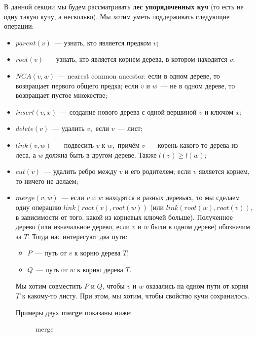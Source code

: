 В данной секции мы будем рассматривать \textbf{лес упорядоченных куч} (то есть не одну такую кучу, а несколько). Мы хотим уметь поддерживать следующие операции:
\begin{itemize}
        \item $parent(v)$~--- узнать, кто является предком $v$;
        \item $root(v)$~--- узнать, кто является корнем дерева, в котором находится $v$;
        \item  $NCA(v, w)$~--- nearest common ancestor: если в одном дереве, то возвращает первого общего предка; если $v$ и $w$~--- не в одном дереве, то возвращает пустое множестве;
        \item $insert(v, x)$~--- создание нового дерева с одной вершиной $v$ и ключом $x;$
        \item $delete(v)$~--- удалить $v,$ если $v$~--- лист;
        \item $link(v, w)$~--- подвесить $v$ к $w,$ причём $v$~--- корень какого-то дерева из леса, а $w$ должна быть в другом дереве. Также $l(v)\geqslant l(w);$
        \item $cut(v)$~--- удалить ребро между $v$ и его родителем; если $v$ является корнем, то ничего не делаем;
       \item $merge(v, w)$~--- если $v$ и $w$ находятся в разных деревьях, то мы сделаем одну операцию $link(root(v), root(w))$ (или $link(root(w), root(v))$, в зависимости от того, какой из корневых ключей больше). Полученное дерево (или изначальное дерево, если $v$ и $w$ были в одном дереве) обозначим за $T$. Тогда нас интересуют два пути:
       \begin{itemize}
           \item $P$~--- путь от $v$ к корню дерева $T$;
           \item $Q$~--- путь от $w$ к корню дерева $T$.
       \end{itemize}
       Мы хотим совместить $P$ и $Q$, чтобы $v$ и $w$ оказались на одном пути от корня $T$ к какому-то листу. При этом, мы хотим, чтобы свойство кучи сохранилось.
       
       Примеры двух \textbf{merge} показаны ниже:
       \begin{figure}[h]
        \caption{merge}
        \label{fig:image}
        \end{figure}
    \end{itemize}
    

